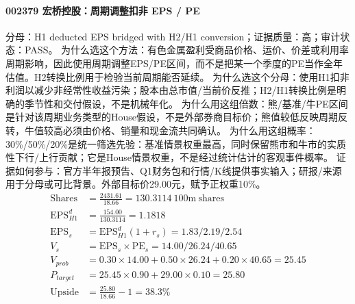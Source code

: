 \paragraph{002379 宏桥控股：周期调整扣非 EPS / PE}
分母：H1 deducted EPS bridged with H2/H1 conversion；证据质量：高；审计状态：PASS。
为什么选这个方法：有色金属盈利受商品价格、运价、价差或利用率周期影响，因此使用周期调整EPS/PE区间，而不是把某一个季度的PE当作全年估值。H2转换比例用于检验当前周期能否延续。
为什么选这个分母：使用H1扣非利润以减少非经常性收益污染；股本由总市值/当前价反推；H2/H1转换比例是明确的季节性和交付假设，不是机械年化。
为什么用这组倍数：熊/基准/牛PE区间是针对该周期业务类型的House假设，不是外部券商目标价；熊值较低反映周期反转，牛值较高必须由价格、销量和现金流共同确认。
为什么用这组概率：30\%/50\%/20\%是统一筛选先验：基准情景权重最高，同时保留熊市和牛市的实质性下行/上行贡献；它是House情景权重，不是经过统计估计的客观事件概率。
证据如何参与：官方半年报预告、Q1财务包和行情/K线提供事实输入；研报/来源用于分母或可比背景。外部目标价29.00元，赋予正权重10\%。
\begin{align*}
\mathrm{Shares} &= \frac{2431.61}{18.66}=130.3114\ \mathrm{100m\ shares}\\
\mathrm{EPS}_{H1}^d &= \frac{154.00}{130.3114}=1.1818\\
\mathrm{EPS}_s &= \mathrm{EPS}_{H1}^d(1+r_s)=1.83/2.19/2.54\\
V_s &= \mathrm{EPS}_s\times \mathrm{PE}_s=14.00/26.24/40.65\\
V_{prob} &= 0.30\times 14.00+0.50\times 26.24+0.20\times 40.65=25.45\\
P_{target} &= 25.45\times 0.90+29.00\times 0.10=25.80\\
\mathrm{Upside} &= \frac{25.80}{18.66}-1=38.3\%\\
\end{align*}

